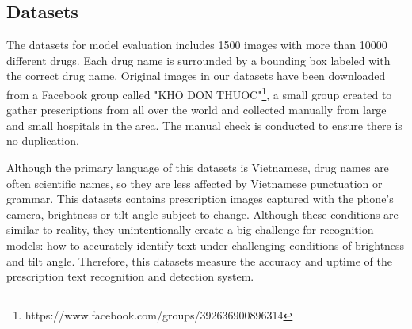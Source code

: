 \subsection{Datasets}
The datasets for model evaluation includes 1500 images with more than 10000 different drugs. Each drug name is surrounded by a bounding box labeled with the correct drug name. Original images in our datasets have been downloaded from a Facebook group called "KHO DON THUOC"\footnote[1]{https://www.facebook.com/groups/392636900896314}, a small group created to gather prescriptions from all over the world and collected manually from large and small hospitals in the area. The manual check is conducted to ensure there is no duplication. 

Although the primary language of this datasets is Vietnamese, drug names are often scientific names, so they are less affected by Vietnamese punctuation or grammar. This datasets contains prescription images captured with the phone's camera, brightness or tilt angle subject to change. Although these conditions are similar to reality, they unintentionally create a big challenge for recognition models: how to accurately identify text under challenging conditions of brightness and tilt angle. Therefore, this datasets measure the accuracy and uptime of the prescription text recognition and detection system.




